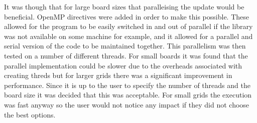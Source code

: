 It was though that for large board sizes that paralleising the update would be beneficial.
OpenMP directives were added in order to make this possible.
These allowed for the program to be easily switched in and out of parallel if the library was not available on some machine for example, and it allowed for a parallel and serial version of the code to be maintained together.
This parallelism was then tested on a number of different threads.
For small boards it was found that the parallel implementation could be slower due to the overheads associated with creating threds but for larger grids there was a significant improvement in performance.
Since it is up to the user to specify the number of threads and the board size it was decided that this was acceptable.
For small grids the execution was fast anyway so the user would not notice any impact if they did not choose the best options.

